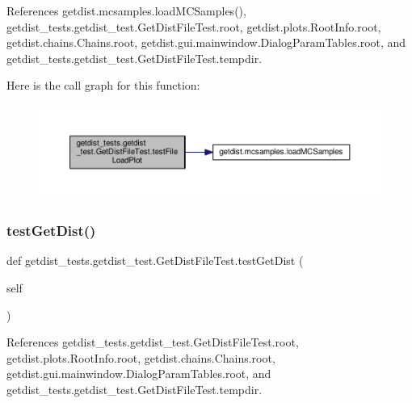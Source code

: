 References getdist.\+mcsamples.\+load\+M\+C\+Samples(), getdist\+\_\+tests.\+getdist\+\_\+test.\+Get\+Dist\+File\+Test.\+root, getdist.\+plots.\+Root\+Info.\+root, getdist.\+chains.\+Chains.\+root, getdist.\+gui.\+mainwindow.\+Dialog\+Param\+Tables.\+root, and getdist\+\_\+tests.\+getdist\+\_\+test.\+Get\+Dist\+File\+Test.\+tempdir.

Here is the call graph for this function\+:
\nopagebreak
\begin{figure}[H]
\begin{center}
\leavevmode
\includegraphics[width=350pt]{classgetdist__tests_1_1getdist__test_1_1GetDistFileTest_aa282696486ba5c65dbbe19e29e9623e9_cgraph}
\end{center}
\end{figure}
\mbox{\label{classgetdist__tests_1_1getdist__test_1_1GetDistFileTest_aab1a319882d71be14dacf9c410204bb3}} 
\subsubsection{\texorpdfstring{test\+Get\+Dist()}{testGetDist()}}
{\footnotesize\ttfamily def getdist\+\_\+tests.\+getdist\+\_\+test.\+Get\+Dist\+File\+Test.\+test\+Get\+Dist (\begin{DoxyParamCaption}\item[{}]{self }\end{DoxyParamCaption})}



References getdist\+\_\+tests.\+getdist\+\_\+test.\+Get\+Dist\+File\+Test.\+root, getdist.\+plots.\+Root\+Info.\+root, getdist.\+chains.\+Chains.\+root, getdist.\+gui.\+mainwindow.\+Dialog\+Param\+Tables.\+root, and getdist\+\_\+tests.\+getdist\+\_\+test.\+Get\+Dist\+File\+Test.\+tempdir.



